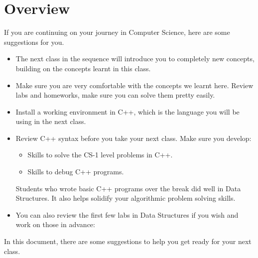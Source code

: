 \documentclass[letterpaper,10pt,english]{sphinxmanual}
\begin{document}
\section{Overview}
\label{\detokenize{lecture_notes/transition:overview}}
If you are continuing on your journey in Computer Science, here are
some suggestions for you.
\begin{itemize}
\item {} 
The next class in the sequence will introduce you to completely new
concepts, building on the concepts learnt in this class.

\item {} 
Make sure you are very comfortable with the concepts we learnt
here. Review labs and homeworks, make sure you can solve them
pretty easily.

\item {} 
Install a working environment in C++, which is the language you
will be using in the next class.

\item {} 
Review C++ syntax before you take your next class. Make sure you
develop:
\begin{itemize}
\item {} 
Skills to solve the CS-1 level problems in C++.

\item {} 
Skills to debug C++ programs.

\end{itemize}

Students who wrote basic C++ programs over the break did well in
Data Structures. It also helps solidify your algorithmic problem
solving skills.

\item {} 
You can also review the first few labs in Data Structures if you
wish and work on those in advance:


\end{itemize}

In this document, there are some suggestions to help you get ready for
your next class.
\end{document}
